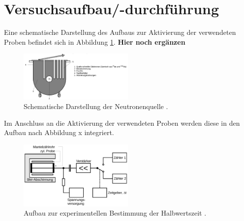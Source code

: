\section{Versuchsaufbau/-durchführung}
Eine schematische Darstellung des Aufbaus zur Aktivierung der verwendeten Proben befindet sich in Abbildung \ref{fig: neutronenquelle}.
\textbf{Hier noch ergänzen}
\begin{figure}
  \centering
  \includegraphics[width=0.5\textwidth]{pics/aufbau.png}
  \caption{Schematische Darstellung der Neutronenquelle \cite{anleitung702}.}
  \label{fig: neutronenquelle}
  \end{figure}

Im Anschluss an die Aktivierung der verwendeten Proben werden diese in den Aufbau nach Abbildung x integriert.

\begin{figure}
\centering
\includegraphics[width=0.5\textwidth]{pics/aufbau_2.png}
\caption{Aufbau zur experimentellen Bestimmung der Halbwertszeit \cite{anleitung702}.}
\label{fig: aufbau}
\end{figure}
